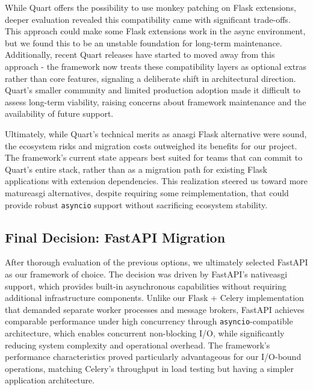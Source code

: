         While Quart offers the possibility to use monkey patching on Flask extensions, deeper evaluation revealed this 
        compatibility came with significant trade-offs. This approach could make some Flask extensions work in the 
        async environment, but we found this to be an unstable foundation for long-term maintenance. Additionally, recent Quart 
        releases have started to moved away from this approach  - the framework now treats these compatibility layers 
        as optional extras rather than core features, signaling a deliberate shift in architectural direction. Quart's 
        smaller community and limited production adoption made it difficult to assess long-term viability, 
        raising concerns about framework maintenance and the availability of future support.

        Ultimately, while Quart's technical merits as an\ac{asgi} Flask alternative were sound, the ecosystem risks and migration 
        costs outweighed its benefits for our project. The framework's current state appears best suited for teams that 
        can commit to Quart's entire stack, rather than as a migration path for existing Flask applications with extension 
        dependencies. This realization steered us toward more mature\ac{asgi} alternatives, despite requiring some 
        reimplementation, that could provide robust \texttt{asyncio} support without sacrificing ecosystem stability.

    \subsection{Final Decision: FastAPI Migration}

        After thorough evaluation of the previous options, we ultimately selected FastAPI as our framework of choice. 
        The decision was driven by FastAPI's native\ac{asgi} support, which provides built-in asynchronous capabilities 
        without requiring additional infrastructure components. Unlike our Flask + Celery implementation that demanded 
        separate worker processes and message brokers, FastAPI achieves comparable performance under high concurrency through 
        \texttt{asyncio}-compatible architecture, which enables concurrent non-blocking I/O, while significantly reducing system 
        complexity and operational overhead. The framework's performance characteristics proved particularly advantageous 
        for our I/O-bound operations, matching Celery's throughput in load testing but having a simpler application 
        architecture.

